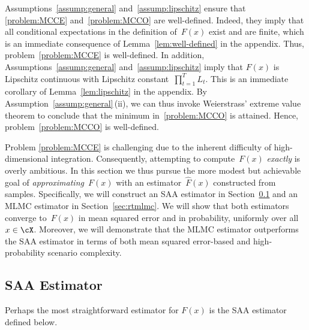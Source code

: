 \documentclass[11pt]{article}
\let\hat\widehat
\begin{document}
Assumptions~\ref{assump:general} and~\ref{assump:lipschitz} ensure that
\eqref{problem:MCCE} and~\eqref{problem:MCCO} are well-defined. Indeed, they imply that all conditional expectations in the definition of~$F(x)$ exist and are finite, which is an immediate consequence of Lemma~\ref{lem:well-defined} in the appendix. Thus, problem~\eqref{problem:MCCE} is well-defined. In addition, Assumptions~\ref{assump:general} and~\ref{assump:lipschitz} imply that $F(x)$ is Lipschitz continuous with Lipschitz constant~$\prod_{t=1}^T L_t$. This is an immediate corollary of Lemma~\ref{lem:lipschitz} in the appendix. By Assumption~\ref{assump:general}\,(ii), we can thus invoke Weierstrass' extreme value theorem to conclude that the minimum in~\eqref{problem:MCCO} is attained. Hence, problem~\eqref{problem:MCCO} is well-defined.

Problem \eqref{problem:MCCE} is challenging due to the inherent difficulty of high-dimensional integration. Consequently, attempting to compute~$F(x)$ {\em exactly} is overly ambitious. In this section we thus pursue the more modest but achievable goal of {\em approximating}~$F(x)$ with an estimator~$\hat F(x)$ constructed from samples. Specifically, we will construct an SAA estimator in Section~\ref{sec:saa} and an MLMC estimator in Section~\ref{sec:rtmlmc}. We will show that both estimators converge to~$F(x)$ in mean squared error and in probability, uniformly over all~$x \in \cX$. Moreover, we will demonstrate that the MLMC estimator outperforms the SAA estimator in terms of both mean squared error-based and high-probability scenario complexity. 


\subsection{SAA Estimator}
\label{sec:saa}
Perhaps the most straightforward estimator for $F(x)$ is the SAA estimator defined below.
\end{document}
